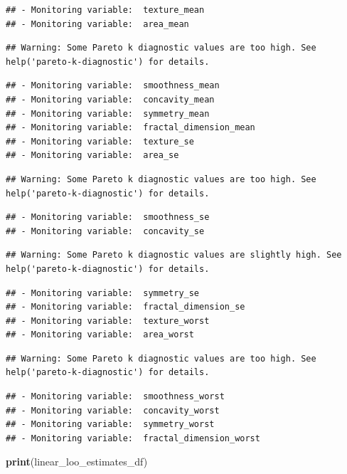 \documentclass[
]{article}
\newenvironment{Shaded}{\begin{snugshade}}{\end{snugshade}}
\newcommand{\KeywordTok}[1]{\textcolor[rgb]{0.13,0.29,0.53}{\textbf{#1}}}
\newcommand{\NormalTok}[1]{#1}
\begin{document}
\begin{verbatim}
## - Monitoring variable:  texture_mean 
## - Monitoring variable:  area_mean
\end{verbatim}

\begin{verbatim}
## Warning: Some Pareto k diagnostic values are too high. See help('pareto-k-diagnostic') for details.
\end{verbatim}

\begin{verbatim}
## - Monitoring variable:  smoothness_mean 
## - Monitoring variable:  concavity_mean 
## - Monitoring variable:  symmetry_mean 
## - Monitoring variable:  fractal_dimension_mean 
## - Monitoring variable:  texture_se 
## - Monitoring variable:  area_se
\end{verbatim}

\begin{verbatim}
## Warning: Some Pareto k diagnostic values are too high. See help('pareto-k-diagnostic') for details.
\end{verbatim}

\begin{verbatim}
## - Monitoring variable:  smoothness_se 
## - Monitoring variable:  concavity_se
\end{verbatim}

\begin{verbatim}
## Warning: Some Pareto k diagnostic values are slightly high. See help('pareto-k-diagnostic') for details.
\end{verbatim}

\begin{verbatim}
## - Monitoring variable:  symmetry_se 
## - Monitoring variable:  fractal_dimension_se 
## - Monitoring variable:  texture_worst 
## - Monitoring variable:  area_worst
\end{verbatim}

\begin{verbatim}
## Warning: Some Pareto k diagnostic values are too high. See help('pareto-k-diagnostic') for details.
\end{verbatim}

\begin{verbatim}
## - Monitoring variable:  smoothness_worst 
## - Monitoring variable:  concavity_worst 
## - Monitoring variable:  symmetry_worst 
## - Monitoring variable:  fractal_dimension_worst
\end{verbatim}

\begin{Shaded}
\begin{Highlighting}[]
\KeywordTok{print}\NormalTok{(linear_loo_estimates_df)}
\end{Highlighting}
\end{Shaded}
\end{document}

